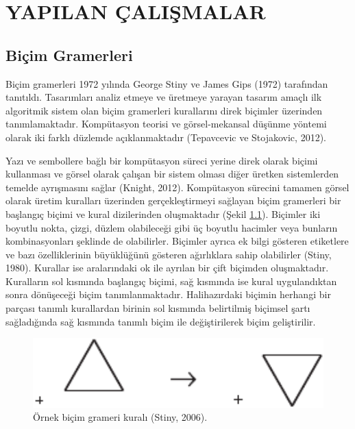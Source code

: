 \documentclass[12pt,turkish,a4paperpaper,]{report}
\begin{document}
\newpage

\hypertarget{yapilan-uxe7aliux15fmalar}{%
\chapter{YAPILAN ÇALIŞMALAR}\label{yapilan-uxe7aliux15fmalar}}

\thispagestyle{empty}

\hypertarget{biuxe7im-gramerleri}{%
\section{Biçim Gramerleri}\label{biuxe7im-gramerleri}}

Biçim gramerleri 1972 yılında George Stiny ve James Gips (1972)
tarafından tanıtıldı. Tasarımları analiz etmeye ve üretmeye yarayan
tasarım amaçlı ilk algoritmik sistem olan biçim gramerleri kurallarını
direk biçimler üzerinden tanımlamaktadır. Kompütasyon teorisi ve
görsel-mekansal düşünme yöntemi olarak iki farklı düzlemde
açıklanmaktadır (Tepavcevic ve Stojakovic, 2012).

Yazı ve sembollere bağlı bir kompütasyon süreci yerine direk olarak
biçimi kullanması ve görsel olarak çalışan bir sistem olması diğer
üretken sistemlerden temelde ayrışmasını sağlar (Knight, 2012).
Kompütasyon sürecini tamamen görsel olarak üretim kuralları üzerinden
gerçekleştirmeyi sağlayan biçim gramerleri bir başlangıç biçimi ve kural
dizilerinden oluşmaktadır (Şekil \ref{shapegrammarrule}). Biçimler iki
boyutlu nokta, çizgi, düzlem olabileceği gibi üç boyutlu hacimler veya
bunların kombinasyonları şeklinde de olabilirler. Biçimler ayrıca ek
bilgi gösteren etiketlere ve bazı özelliklerinin büyüklüğünü gösteren
ağırlıklara sahip olabilirler (Stiny, 1980). Kurallar ise aralarındaki
ok ile ayrılan bir çift biçimden oluşmaktadır. Kuralların sol kısmında
başlangıç biçimi, sağ kısmında ise kural uygulandıktan sonra dönüşeceği
biçim tanımlanmaktadır. Halihazırdaki biçimin herhangi bir parçası
tanımlı kurallardan birinin sol kısmında belirtilmiş biçimsel şartı
sağladığında sağ kısmında tanımlı biçim ile değiştirilerek biçim
geliştirilir.

\begin{figure}
\centering
\includegraphics[width=1\textwidth,height=\textheight]{source/figures/shape_grammar_rule.pdf}
\caption{Örnek biçim grameri kuralı (Stiny, 2006).
\label{shapegrammarrule}}
\end{figure}
\end{document}
